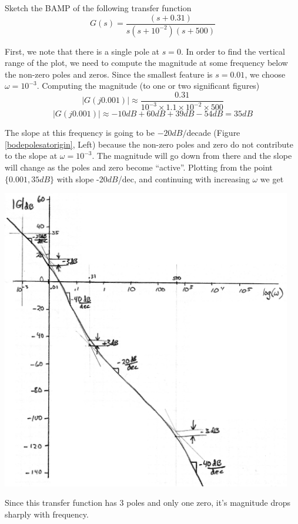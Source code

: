 \begin{Example}
Sketch the BAMP of the following transfer function
\[
G(s) = \frac      {(s+0.31)}       {s(s+10^{-2})(s+500)}
\]

First, we note that there is a single pole at $s=0$.    In order to find the vertical range of the plot, we need to compute the magnitude at some frequency below the non-zero poles and zeros.   Since the smallest feature is $s=0.01$, we choose $\omega=10^{-3}$.  Computing the magnitude  (to one or two significant figures)
\[
|G(j0.001)| \approx  \frac   {0.31}    {10^{-3}\times1.1\times10^{-2}\times500}
\]
\[
|G(j0.001)| \approx  {-10dB} + 60dB + 39dB - 54dB = 35dB
\]

The slope at this frequency is going to be $-20dB/$decade (Figure \ref{bodepolesatorigin}, Left) because the non-zero poles and zero do not contribute to the slope at $\omega = 10^{-3}$.    The magnitude will go down from there and the slope will change as the poles and zero become ``active''.   Plotting from the point $\{0.001, 35dB\}$ with slope -20$dB$/dec, and continuing with increasing $\omega$ we get

\includegraphics[width=5.0in]{figs05/00966.png}

Since this transfer function has 3 poles and only one zero, it's magnitude drops sharply with frequency.

\end{Example}


